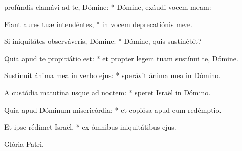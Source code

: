 \begin{psalmus}

     profúndis clamávi ad te, Dómine: * Dómine, exáudi vocem meam:

    Fiant aures tuæ intendéntes, * in vocem deprecatiónis meæ.

    Si iniquitátes observáveris, Dómine: * Dómine, quis sustinébit?

    Quia apud te propitiátio est: * et propter legem tuam sustínui te, Dómine.

    Sustínuit ánima mea in verbo ejus: * sperávit ánima mea in Dómino.

    A custódia matutína usque ad noctem: * speret Israël in Dómino.

    Quia apud Dóminum misericórdia: * et copiósa apud eum redémptio.

    Et ipse rédimet Israël, * ex ómnibus iniquitátibus ejus.

		Glória Patri.

\end{psalmus}
